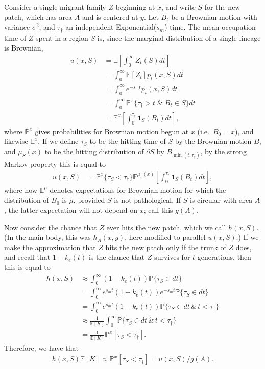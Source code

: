 \documentclass{article}
\renewcommand{\P}{\mathbb{P}}
\newcommand{\E}{\mathbb{E}}
\newcommand{\one}{\mathbf{1}}
\begin{document}
Consider a single migrant family $Z$ beginning at $x$,
and write $S$ for the new patch, which has area $A$ and is centered at $y$.
Let $B_t$ be a Brownian motion with variance $\sigma^2$, 
and $\tau_\dagger$ an independent Exponential($s_m$) time.
The mean occupation time of $Z$ spent in a region $S$ is,
since the marginal distribution of a single lineage is Brownian,
\begin{align}
    u(x,S) &= \E\left[\int_0^\infty Z_t(S) dt \right] \\
           &= \int_0^\infty \E[Z_t] p_t(x,S) dt \\
        &= \int_0^\infty e^{-s_m t} p_t(x,S) dt \\
        &= \int_0^\infty \P^x\{ \tau_\dagger > t \; \& \; B_t \in S \} dt \\
        &= \E^x\left[ \int_0^{\tau_\dagger} \one_S(B_t) dt \right]  ,
\end{align}
where $\P^x$ gives probabilities for Brownian motion begun at $x$ (i.e.\ $B_0=x$),
and likewise $\E^x$.
If we define
$\tau_S$ to be the hitting time of $S$ by the Brownian motion $B$,
and $\mu_S(x)$ to be the hitting distribution of $\partial S$ by $B_{\min(t,\tau_\dagger)}$,
by the strong Markov property this is equal to
\begin{align}
    u(x,S) %
           &= \P^x\{ \tau_S < \tau_\dagger \}  \E^{\mu_S(x)}\left[ \int_0^{\tau_\dagger} \one_S(B_t) dt \right] ,
\end{align}
where now $\E^\mu$ denotes expectations for Brownian motion for which the distribution of $B_0$ is $\mu$, 
provided $S$ is not pathological.
If $S$ is circular with area $A$, the latter expectation will not depend on $x$;
call this $g(A)$.

Now consider the chance that $Z$ ever hits the new patch, which we call $h(x,S)$.
(In the main body, this was $h_A(x,y)$, here modified to parallel $u(x,S)$.)
If we make the approximation that $Z$ hits the new patch only if the trunk of $Z$ does,
and recall that $1-k_e(t)$ is the chance that $Z$ survives for $t$ generations,
then this is equal to
\begin{align}
    h(x,S) &\approx \int_0^\infty (1-k_e(t)) \P\{ \tau_S \in dt \} \\
    &= \int_0^\infty e^{s_m t} (1-k_e(t)) e^{- s_m t } \P\{ \tau_S \in dt \} \\
    &=\int_0^\infty e^{s_m t} (1-k_e(t)) \P\{ \tau_S \in dt \, \& \, t < \tau_\dagger \} \\
    &\approx \frac{1}{\E[K]} \int_0^\infty \P\{ \tau_S \in dt \, \& \, t < \tau_\dagger \} \\
    &= \frac{1}{\E[K]} \P^x[ \tau_S < \tau_\dagger ] .
\end{align}
Therefore, we have that
\begin{align}
    h(x,S) \E[K] 
    \approx \P^x[ \tau_S < \tau_\dagger ] 
    = u(x,S) / g(A) .
\end{align}
\end{document}
